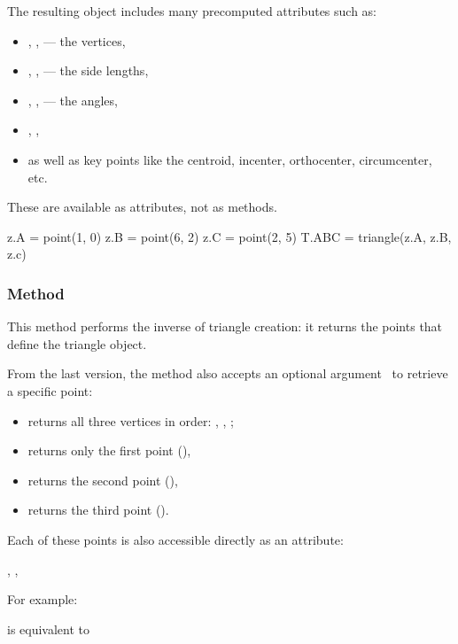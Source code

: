 The resulting object includes many precomputed attributes such as:
\begin{itemize}
  \item {}, ,  — the vertices,
  \item {}, ,  — the side lengths,
  \item {}, ,  — the angles,
  \item {}, ,
  \item as well as key points like the centroid, incenter, orthocenter, circumcenter, etc.
\end{itemize}


These are available as attributes, not as methods.

\vspace{1em}
\begin{mybox}
  \begin{tkzexample}
    z.A = point(1, 0)
    z.B = point(6, 2)
    z.C = point(2, 5)
    T.ABC = triangle(z.A, z.B, z.c)
  \end{tkzexample}
\end{mybox}

\subsubsection{Method }
\label{ssub:method_triangle_get}

This method performs the inverse of triangle creation: it returns the points that define the triangle object.

\medskip

From the last version, the method also accepts an optional argument~ to retrieve a specific point:
\begin{itemize}
  \item {} returns all three vertices in order: , , ;
  \item {} returns only the first point (),
  \item {} returns the second point (),
  \item {} returns the third point ().
\end{itemize}

\medskip

Each of these points is also accessible directly as an attribute:
\begin{center}
, , 
\end{center}
For example:
\begin{center}
 is equivalent to 
\end{center}

